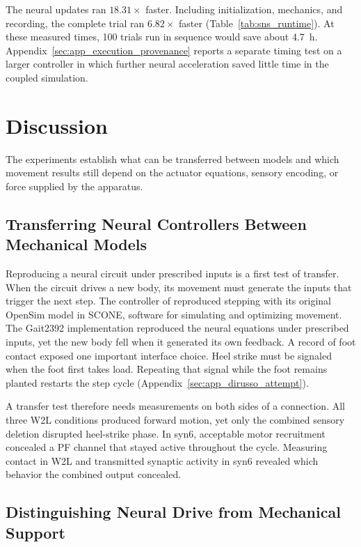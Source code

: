 The neural updates ran $18.31\times$ faster. Including initialization, mechanics, and recording, the complete trial ran $6.82\times$ faster (Table~\ref{tab:sns_runtime}). At these measured times, 100 trials run in sequence would save about \qty{4.7}{\hour}. Appendix~\ref{sec:app_execution_provenance} reports a separate timing test on a larger controller in which further neural acceleration saved little time in the coupled simulation.

\section{Discussion}\label{sec:sns_discussion}

The experiments establish what can be transferred between models and which movement results still depend on the actuator equations, sensory encoding, or force supplied by the apparatus.

\subsection{Transferring Neural Controllers Between Mechanical Models}

Reproducing a neural circuit under prescribed inputs is a first test of transfer. When the circuit drives a new body, its movement must generate the inputs that trigger the next step. The controller of \citet{dirusso_investigating_2023} reproduced stepping with its original OpenSim model in SCONE, software for simulating and optimizing movement. The Gait2392 implementation reproduced the neural equations under prescribed inputs, yet the new body fell when it generated its own feedback. A record of foot contact exposed one important interface choice. Heel strike must be signaled when the foot first takes load. Repeating that signal while the foot remains planted restarts the step cycle (Appendix~\ref{sec:app_dirusso_attempt}).

A transfer test therefore needs measurements on both sides of a connection. All three W2L conditions produced forward motion, yet only the combined sensory deletion disrupted heel-strike phase. In syn6, acceptable motor recruitment concealed a PF channel that stayed active throughout the cycle. Measuring contact in W2L and transmitted synaptic activity in syn6 revealed which behavior the combined output concealed.

\subsection{Distinguishing Neural Drive from Mechanical Support}

